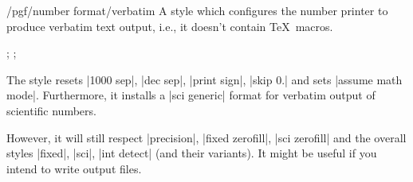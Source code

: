 \begin{stylekey}{/pgf/number format/verbatim}
    A style which configures the number printer to produce verbatim text
    output, i.e., it doesn't contain \TeX\ macros.
\begin{codeexample}[preamble={\usetikzlibrary{fpu}}, pre={\begin{lateximage}},post={\end{lateximage}}]
;
;
\pgfmathprintnumber{\pgfmathresult}
\end{codeexample}
    The style resets |1000 sep|, |dec sep|, |print sign|, |skip 0.| and sets
    |assume math mode|. Furthermore, it installs a |sci generic| format for
    verbatim output of scientific numbers.

    However, it will still respect |precision|, |fixed zerofill|,
    |sci zerofill| and the overall styles |fixed|, |sci|, |int detect| (and
    their variants). It might be useful if you intend to write output files.
\end{stylekey}


%
